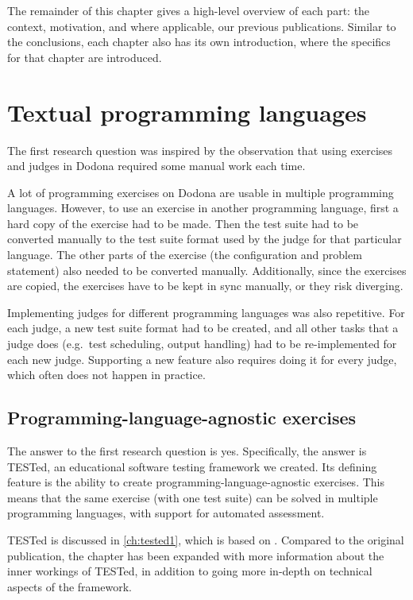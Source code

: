 \documentclass[../main]{subfiles}
\begin{document}
The remainder of this chapter gives a high-level overview of each part: the context, motivation, and where applicable, our previous publications.
Similar to the conclusions, each chapter also has its own introduction, where the specifics for that chapter are introduced.

\section{Textual programming languages}\label{sec:intro-tested}

The first research question was inspired by the observation that using exercises and judges in Dodona required some manual work each time.

A lot of programming exercises on Dodona are usable in multiple programming languages.
However, to use an exercise in another programming language, first a hard copy of the exercise had to be made.
Then the test suite had to be converted manually to the test suite format used by the judge for that particular language.
The other parts of the exercise (the configuration and problem statement) also needed to be converted manually.
Additionally, since the exercises are copied, the exercises have to be kept in sync manually, or they risk diverging.

Implementing judges for different programming languages was also repetitive.
For each judge, a new test suite format had to be created, and all other tasks that a judge does (e.g.\ test scheduling, output handling) had to be re-implemented for each new judge.
Supporting a new feature also requires doing it for every judge, which often does not happen in practice.

\subsection{Programming-language-agnostic exercises}\label{subsec:programming-language-agnostic-testing}

The answer to the first research question is yes.
Specifically, the answer is TESTed, an educational software testing framework we created.
Its defining feature is the ability to create programming-language-agnostic exercises.
This means that the same exercise (with one test suite) can be solved in multiple programming languages, with support for automated assessment.

TESTed is discussed in \cref{ch:tested1}, which is based on \textcite{strijbolTESTedEducationalTesting2023}.
Compared to the original publication, the chapter has been expanded with more information about the inner workings of TESTed, in addition to going more in-depth on technical aspects of the framework.
\end{document}
